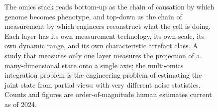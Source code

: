 \begin{figure}[htbp]
\caption[The omics stack]{The omics stack reads bottom-up as the
chain of causation by which genome becomes phenotype, and top-down
as the chain of measurement by which engineers reconstruct what
the cell is doing. Each layer has its own measurement technology,
its own scale, its own dynamic range, and its own characteristic
artefact class. A study that measures only one layer measures the
projection of a many-dimensional state onto a single axis; the
multi-omics integration problem is the engineering problem of
estimating the joint state from partial views with very different
noise statistics. Counts and figures are order-of-magnitude human
estimates current as of 2024.}
\label{fig:vol06:ch11:omics-stack}
\end{figure}
